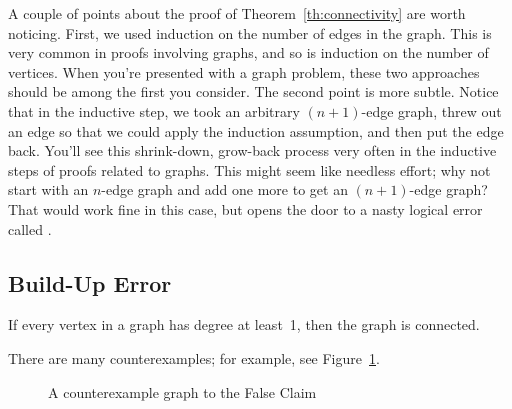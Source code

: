 A couple of points about the proof of Theorem~\ref{th:connectivity} are
worth noticing.  First, we used induction on the number of
edges in the graph.  This is very common in proofs involving graphs, and
so is induction on the number of vertices.  When you're presented with a
graph problem, these two approaches should be among the first you
consider.  The second point is more subtle.  Notice that in the inductive
step, we took an arbitrary $(n+1)$-edge graph, threw out an edge so that
we could apply the induction assumption, and then put the edge back.
You'll see this shrink-down, grow-back process very often in the inductive
steps of proofs related to graphs.  This might seem like needless effort;
why not start with an $n$-edge graph and add one more to get an
$(n+1)$-edge graph?  That would work fine in this case, but opens the door
to a nasty logical error called .

\subsection{Build-Up Error}

\begin{falseclm*}
If every vertex in a graph has degree at least~1, then the graph is
connected.
\end{falseclm*}

There are many counterexamples; for example, see Figure~\ref{fig:5Z}.

\begin{figure}[h]

\missinggraphic

\caption{A counterexample graph to the False Claim}

\label{fig:5Z}
\end{figure}

